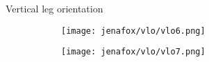 \begin{frame}{Vertical leg orientation}
\begin{figure}[H]
\begin{subfigure}[b]{0.25\linewidth}
        \end{subfigure}%
        \begin{subfigure}[b]{0.25\linewidth}%
            \centering%
            \texttt{[image: jenafox/vlo/vlo6.png]}
            \label{fig:jenafox-vlo6}%
        \end{subfigure}%
        \begin{subfigure}[b]{0.25\linewidth}%
            \centering%
            \texttt{[image: jenafox/vlo/vlo7.png]}
            \label{fig:jenafox-vlo7}%
        \end{subfigure}%
    \end{figure}%
\end{frame}%
%